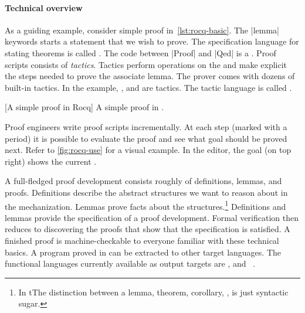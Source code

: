 \paragraph*{Technical overview}
As a guiding example, consider simple proof in~\autoref{lst:rocq-basic}. The
\pr|lemma| keywords starts a statement that we wish to prove. The specification
language for stating theorems is called . The code between
\pr|Proof| and \pr|Qed| is a \emph{}. Proof scripts consists
of \emph{tactics}. Tactics perform operations on the
\emph{} and make explicit the steps needed to prove the
associate lemma. The  prover comes with dozens of built-in
tactics. In the example, ,  and
 are tactics. The tactic language is
called .

\begin{center}
\begin{minipage}{\textwidth}
\captionsetup{type=lstlisting}
[A simple proof in Rocq]{
   A simple proof in .}
\label{lst:rocq-basic}
\end{minipage}
\end{center}

Proof engineers write proof scripts incrementally. At each step (marked with a
period) it is possible to evaluate the proof and see what goal should be proved
next. Refer to \autoref{fig:rocq-use} for a visual example. In the editor, the
goal (on top right) shows the current .

A full-fledged proof development consists roughly of definitions, lemmas, and
proofs. Definitions describe the abstract structures we want to reason about in
the mechanization. Lemmas prove facts about the structures.\footnote{In
 tThe distinction between a lemma, theorem, corollary, \etc, is just
syntactic sugar.} Definitions and lemmas provide the
specification of a proof development. Formal
verification then reduces to discovering the proofs
that show that the specification is satisfied. A finished proof is
machine-checkable to everyone familiar with these technical basics. A program
proved in  can be extracted to other target languages. The functional
languages currently available as output targets are , 
and ~\cite{rocqdoc}.

